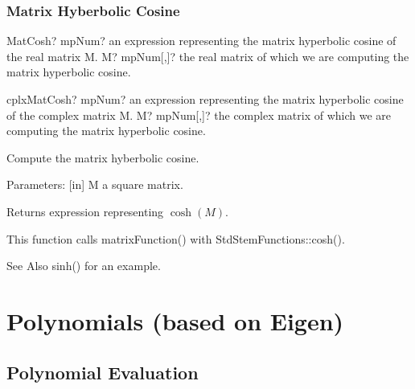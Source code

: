 \subsection{Matrix Hyberbolic Cosine}


\begin{mpFunctionsExtract}
	\mpFunctionOne
	{MatCosh? mpNum? an expression representing the matrix hyperbolic cosine of the real matrix M.}
	{M? mpNum[,]? the real matrix of which we are computing the matrix hyperbolic cosine.}
\end{mpFunctionsExtract}

\vspace{0.6cm}
\begin{mpFunctionsExtract}
	\mpFunctionOne
	{cplxMatCosh? mpNum? an expression representing the matrix hyperbolic cosine of the complex matrix M.}
	{M? mpNum[,]? the complex matrix of which we are computing the matrix hyperbolic cosine.}
\end{mpFunctionsExtract}

%

\vspace{0.3cm}
Compute the matrix hyberbolic cosine.

Parameters: [in] M a square matrix.  

Returns expression representing $\cosh(M)$.

This function calls matrixFunction() with StdStemFunctions::cosh().

See Also sinh() for an example.





\chapter{Polynomials (based on Eigen)}
\label{Polynomials} %




\section{Polynomial Evaluation}
\label{PolynomialEvaluationPolynomials}

